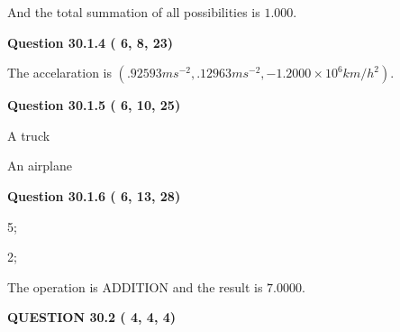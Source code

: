 \documentclass[12pt]{article}
\begin{document}
\noindent
 And the total summation of all possibilities is $  %
1.000 $.
 
 
 
  
\vspace{0.2in}
  
{\textbf{\Large{Question
30.1.4 
 (          6,          8,         23)
}}}
  
  
 
 
\noindent{}
 
 
The accelaration is
$(
.92593ms^{-2},
.12963ms^{-2},
-1.2000 \times 10^{6}km/h^2
).
$
 
 
 
 
  
\vspace{0.2in}
  
{\textbf{\Large{Question
30.1.5 
 (          6,         10,         25)
}}}
  
  
 
 
\noindent{}
 
 
A truck
 
 
An airplane
 
 
 
 
  
\vspace{0.2in}
  
{\textbf{\Large{Question
30.1.6 
 (          6,         13,         28)
}}}
  
  
 
 
\noindent{}

5;
 
2;
 
The operation is  %
ADDITION and the result is
$ %
7.0000$.
 
 
 
  
\vspace{0.2in}
  
{\textbf{\Large{QUESTION
30.2 
 (          4,          4,          4)
}}}
  
  
 
 
\noindent{}
  
\end{document}
